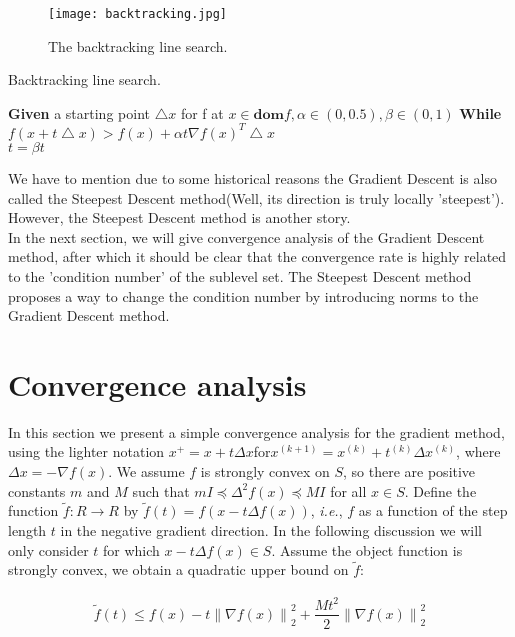 \documentclass{acm_proc_article-sp}
\begin{document}
\begin{figure}
        \texttt{[image: backtracking.jpg]}
    \caption{\label{fig:back}The backtracking line search.}
\end{figure}

\begin{algorithm}\caption{\label{alg:B}Backtracking line search.}
\begin{algorithmic}
\STATE \textbf{Given} a starting point $\bigtriangleup x$ for f at $x \in \textbf{dom} f, \alpha \in (0,0.5), \beta \in (0,1)$
\STATE \textbf{While} $f(x + t\bigtriangleup x) > f(x) + \alpha t \nabla f(x)^T \bigtriangleup x$ \\
{$t = \beta t$}
\end{algorithmic}
\end{algorithm}
We have to mention due to some historical reasons the Gradient Descent is also called the Steepest Descent method\cite{avriel2003nonlinear}(Well, its direction is truly locally 'steepest'). However, the Steepest Descent method is another story.\\
In the next section, we will give convergence analysis of the Gradient Descent method, after which it should be clear that the convergence rate is highly related to the 'condition number' of the sublevel set. The Steepest Descent method proposes a way to change the condition number by introducing norms to the Gradient Descent method.\\

\section{Convergence analysis\cite{boyd2004convex}}
In this section we present a simple convergence analysis for the gradient method,
using the lighter notation $x^{+}=x+t\Delta x$for$x^{(k+1)}=x^{(k)}+t^{(k)}\Delta x^{(k)}$, where$\Delta x=-\nabla f(x)$.
We assume $f$ is strongly convex on $S$, 
so there are positive constants $m$ and $M$ such that $mI\preceq \Delta^{2}f(x)\preceq MI$ for all $x\in S$.
Define the function $\widetilde{f}:R\rightarrow R$ by $\widetilde{f}(t)=f(x-t\Delta f(x))$, \textit{i.e.},
$f$ as a function of the step length $t$ in the negative gradient direction. 
In the following discussion we will only consider $t$ for which $x-t\Delta f(x)\in S$. 
Assume the object function is strongly convex, we obtain a quadratic upper bound on $\widetilde{f}$:

\begin{eqnarray}
\widetilde{f}(t)\leq f(x)-t\left\| \nabla f\left( x\right) \right\| _{2}^{2} + \dfrac {Mt^{2}} {2}\left\| \nabla f\left( x\right) \right\| _{2}^{2}
\label{eq:9.17}
\end{eqnarray}
\end{document}
